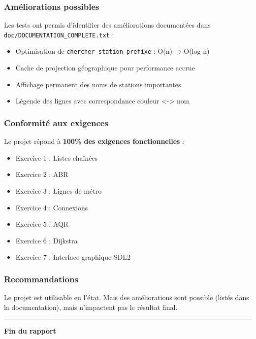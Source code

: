 \documentclass[
]{article}
\providecommand{\tightlist}{%
  \setlength{\itemsep}{0pt}\setlength{\parskip}{0pt}}
\begin{document}
\subsubsection{Améliorations
possibles}\label{amuxe9liorations-possibles}

Les tests ont permis d'identifier des améliorations documentées dans
\texttt{doc/DOCUMENTATION\_COMPLETE.txt} :

\begin{itemize}
\tightlist
\item
  Optimisation de \texttt{chercher\_station\_prefixe} : O(n) → O(log n)
\item
  Cache de projection géographique pour performance accrue
\item
  Affichage permanent des noms de stations importantes
\item
  Légende des lignes avec correspondance couleur
  \textless-\textgreater{} nom
\end{itemize}

\subsubsection{Conformité aux
exigences}\label{conformituxe9-aux-exigences}

Le projet répond à \textbf{100\% des exigences fonctionnelles} :

\begin{itemize}
\tightlist
\item
  Exercice 1 : Listes chaînées
\item
  Exercice 2 : ABR
\item
  Exercice 3 : Lignes de métro
\item
  Exercice 4 : Connexions
\item
  Exercice 5 : AQR
\item
  Exercice 6 : Dijkstra
\item
  Exercice 7 : Interface graphique SDL2
\end{itemize}

\subsubsection{Recommandations}\label{recommandations}

Le projet est utilisable en l'état. Mais des améliorations sont possible
(listés dans la documentation), mais n'impactent pas le résultat final.

\begin{center}\rule{0.5\linewidth}{0.5pt}\end{center}

\textbf{Fin du rapport}
\end{document}
